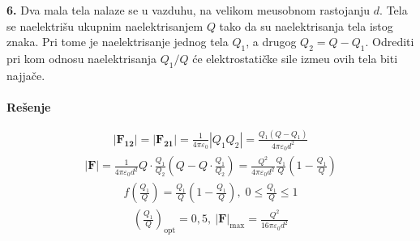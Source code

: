 \clearpage
\textbf{\Large 6.} Dva mala tela nalaze se u vazduhu, na velikom me\dj{}usobnom rastojanju $d$. Tela se naelektri\v{s}u ukupnim naelektrisanjem $Q$ tako da su naelektrisanja tela istog znaka. Pri tome je naelektrisanje jednog tela $Q_1$, a drugog $Q_2 = Q-Q_1$. Odrediti pri kom odnosu naelektrisanja $Q_1 / Q$ \'{c}e elektrostati\v{c}ke sile izme\dj{}u ovih tela biti najja\v{c}e.
\\\\
\textbf{\Large Re\v{s}enje}

\begin{align*}
    |\mathbf{F_{12}}| = |\mathbf{F_{21}}| = \frac{1}{4\pi\varepsilon_0} |Q_1Q_2| 
    = \frac{Q_1(Q-Q_1)}{4\pi\varepsilon_0 d^2}
\end{align*}
\begin{align*}
    |\mathbf{F}| = \frac{1}{4\pi\varepsilon_0d^2}Q\cdot \frac{Q_1}{Q_2}\left(Q - Q\cdot\frac{Q_1}{Q_2}\right) 
    = \frac{Q^2}{4\pi\varepsilon_0d^2}\frac{Q_1}{Q}\left(1 - \frac{Q_1}{Q}\right)
\end{align*}
\begin{align*}
    f\left(\frac{Q_1}{Q}\right) = \frac{Q_1}{Q}\left(1 - \frac{Q_1}{Q}\right),\; 0 \leq \frac{Q_1}{Q} \leq 1
\end{align*}
\begin{align*}
    \boxed{\left(\frac{Q_1}{Q}\right)_\mathrm{opt} = 0,5},\ 
    \boxed{\mathbf{|F|}_\mathrm{max} = \frac{Q^2}{16\pi\varepsilon_0 d^2}}
\end{align*}




